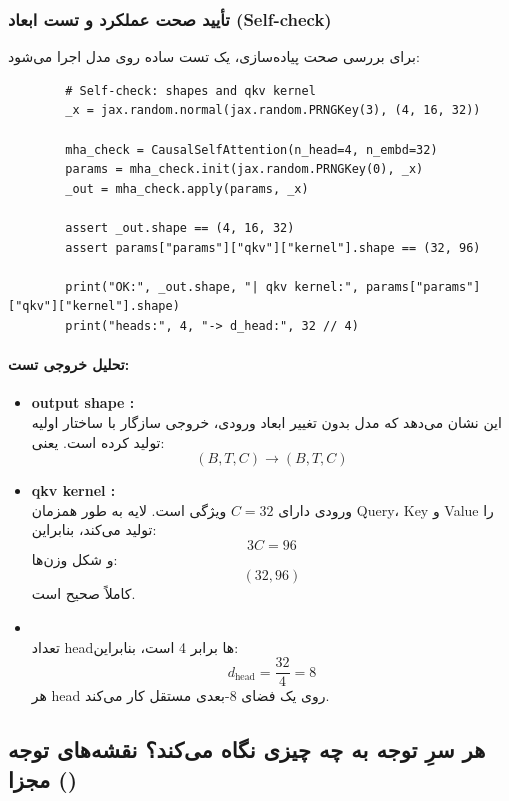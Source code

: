 \documentclass{article}
\begin{document}
\subsubsection*{تأیید صحت عملکرد و تست ابعاد (Self-check)}

برای بررسی صحت پیاده‌سازی، یک تست ساده روی مدل اجرا می‌شود:

\begin{latin}
	\begin{verbatim}
		# Self-check: shapes and qkv kernel
		_x = jax.random.normal(jax.random.PRNGKey(3), (4, 16, 32))
		
		mha_check = CausalSelfAttention(n_head=4, n_embd=32)
		params = mha_check.init(jax.random.PRNGKey(0), _x)
		_out = mha_check.apply(params, _x)
		
		assert _out.shape == (4, 16, 32)
		assert params["params"]["qkv"]["kernel"].shape == (32, 96)
		
		print("OK:", _out.shape, "| qkv kernel:", params["params"]["qkv"]["kernel"].shape)
		print("heads:", 4, "-> d_head:", 32 // 4)
	\end{verbatim}
\end{latin}

\paragraph{تحلیل خروجی تست:}

\begin{itemize}
	
	\item \textbf{output shape :} \\
	این نشان می‌دهد که مدل بدون تغییر ابعاد ورودی، خروجی سازگار با ساختار اولیه تولید کرده است. یعنی:
	\[
	(B, T, C) \rightarrow (B, T, C)
	\]
	
	\item \textbf{qkv kernel :} \\
	ورودی دارای \( C = 32 \) ویژگی است. لایه  به طور همزمان Query، Key و Value را تولید می‌کند، بنابراین:
	\[
	3C = 96
	\]
	و شکل وزن‌ها:
	\[
	(32, 96)
	\]
	کاملاً صحیح است.
	
	\item \textbf{} \\
	تعداد headها برابر 4 است، بنابراین:
	\[
	d_{\text{head}} = \frac{32}{4} = 8
	\]
	هر head روی یک فضای 8-بعدی مستقل کار می‌کند.
	
\end{itemize}
\subsection{هر سرِ توجه به چه چیزی نگاه می‌کند؟ نقشه‌های توجه مجزا ()}
\end{document}
